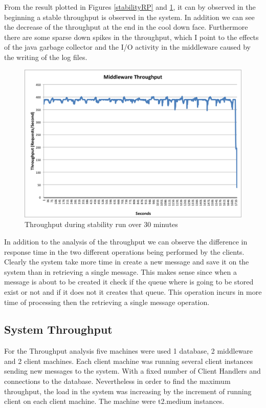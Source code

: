 From the result plotted in Figures \ref{stabilityRP} and \ref{stabilityTHR}, it can by observed in the beginning a stable throughput is observed in the system. In addition we can see the decrease of the throughput at the end in the cool down face. Furthermore there are some sparse down spikes in the throughput, which I point to the effects of the java garbage collector and the I/O activity in the middleware caused by the writing of the log files.\\
\begin{figure}[h!]
	\centering
	\includegraphics[scale=0.35]{stabilityTHR.png}
	\caption{Throughput during stability run over 30 minutes}
	\label{stabilityTHR}
\end{figure}
In addition to the analysis of the throughput we can observe the difference in response time in the two different operations being performed by the clients. Clearly the system take more time in create a new message and save it on the system than in retrieving a single message. This makes sense since when a message is about to be created it check if the queue where is going to be stored exist or not and if it does not it creates that queue. This operation incurs in more time of processing then the retrieving a single message operation.


\subsection{System Throughput}\label{sec:system-throughput}
For the Throughput analysis five machines were used 1 database, 2 middleware and 2 client machines. Each client machine was running several client instances sending new messages to the system. With a fixed number of Client Handlers and connections to the database. Nevertheless in order to find the maximum throughput, the load in the system was increasing by the increment of running client on each client machine. The machine were t2.medium instances.

